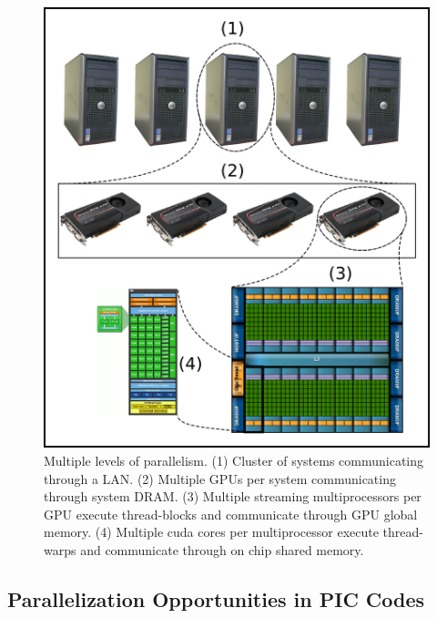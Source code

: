 \begin{figure}
\begin{center}
\includegraphics[width=5in]{introduction/multi_parallel.png}
\end{center}
\caption{Multiple levels of parallelism. (1) Cluster of systems communicating through a LAN. (2) Multiple GPUs per system communicating through system DRAM. (3) Multiple streaming multiprocessors per GPU execute thread-blocks and communicate through GPU global memory. (4) Multiple cuda cores per multiprocessor execute thread-warps and communicate through on chip shared memory. }
\label{fig:multiparallel}
\end{figure}

		\subsection{Parallelization Opportunities in PIC Codes}

